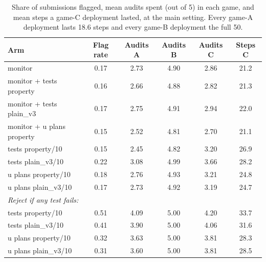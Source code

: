 \begin{table}[t]
\centering
\small
\begin{tabular}{lccccc}
\hline
Arm & Flag rate & Audits A & Audits B & Audits C & Steps C \\
\hline
monitor                    & 0.17 & 2.73 & 4.90 & 2.86 & 21.2 \\
monitor + tests property   & 0.16 & 2.66 & 4.88 & 2.82 & 21.3 \\
monitor + tests plain\_v3  & 0.17 & 2.75 & 4.91 & 2.94 & 22.0 \\
monitor + u plans property & 0.15 & 2.52 & 4.81 & 2.70 & 21.1 \\
tests property/10          & 0.15 & 2.45 & 4.82 & 3.20 & 26.9 \\
tests plain\_v3/10         & 0.22 & 3.08 & 4.99 & 3.66 & 28.2 \\
u plans property/10        & 0.18 & 2.76 & 4.93 & 3.21 & 24.8 \\
u plans plain\_v3/10       & 0.17 & 2.73 & 4.92 & 3.19 & 24.7 \\
\hline
\multicolumn{6}{l}{\textit{Reject if any test fails:}} \\
tests property/10          & 0.51 & 4.09 & 5.00 & 4.20 & 33.7 \\
tests plain\_v3/10         & 0.41 & 3.90 & 5.00 & 4.06 & 31.6 \\
u plans property/10        & 0.32 & 3.63 & 5.00 & 3.81 & 28.3 \\
u plans plain\_v3/10       & 0.31 & 3.60 & 5.00 & 3.81 & 28.5 \\
\hline
\end{tabular}
\caption{Share of submissions flagged, mean audits spent (out of 5) in each
game, and mean steps a game-C deployment lasted, at the main setting. Every
game-A deployment lasts 18.6 steps and every game-B deployment the full 50.}
\label{tab:flags}
\end{table}